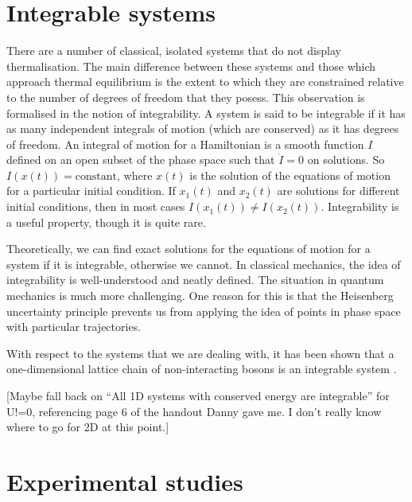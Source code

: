 \documentclass[a4paper,10pt]{article}
\theoremstyle{plain}
\begin{document}
\section{Integrable systems}
There are a number of classical, isolated systems that do not display thermalisation. The main difference between these systems and those which approach thermal equilibrium is the extent to which
they are constrained relative to the number of degrees of freedom that they posess. This observation is formalised in the notion of integrability. A system is said to be integrable if it has  as
many independent integrals of motion (which are conserved) as it has degrees of freedom. An integral of motion for a Hamiltonian is a smooth function $I$ defined on an open subset of the
phase space such that $\dot{I}=0$ on solutions. So $I(x(t))=\text{constant}$, where $x(t)$ is the solution of the equations of motion
for a particular initial condition. If $x_1(t)$ and $x_2(t)$ are solutions for different initial conditions, then in most cases $I(x_1(t))\ne I(x_2(t))$.
Integrability is a useful property, though it is quite rare.

Theoretically, we can find exact solutions for the equations of motion for a system if it is integrable, otherwise we cannot.
In classical mechanics, the idea of integrability is well-understood and neatly defined. The situation in quantum mechanics is much more challenging. One reason for this is that
the Heisenberg uncertainty principle prevents us from applying the idea of points in phase space with particular trajectories.

With respect to the systems that we are dealing with, it has been shown that a one-dimensional lattice chain of non-interacting bosons is an integrable system \cite{Rigol2007}.



 [Maybe fall back on ``All 1D systems with conserved energy are integrable'' for U!=0, referencing page 6 of the handout Danny gave me. I don't really know where
to go for 2D at this point.]

\newpage
\section{Experimental studies}
\end{document}

